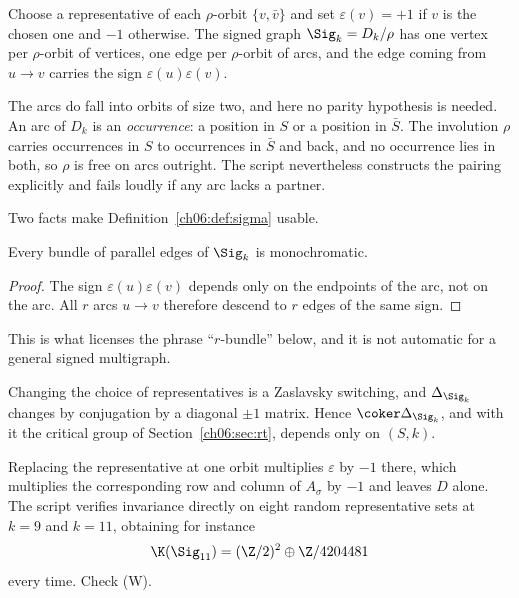 \begin{definition}\label{ch06:def:sigma}
Choose a representative of each $\rho$-orbit $\{v,\bar v\}$ and set $\varepsilon(v)=+1$ if
$v$ is the chosen one and $-1$ otherwise. The signed graph $\Sig_k=D_k/\rho$ has one vertex
per $\rho$-orbit of vertices, one edge per $\rho$-orbit of arcs, and the edge coming from
$u\to v$ carries the sign $\varepsilon(u)\varepsilon(v)$.
\end{definition}

The arcs do fall into orbits of size two, and here no parity hypothesis is needed. An arc of
$D_k$ is an \emph{occurrence}: a position in $S$ or a position in $\bar S$. The involution
$\rho$ carries occurrences in $S$ to occurrences in $\bar S$ and back, and no occurrence lies
in both, so $\rho$ is free on arcs outright. The script nevertheless constructs the pairing
explicitly and fails loudly if any arc lacks a partner.

Two facts make Definition~\ref{ch06:def:sigma} usable.

\begin{lemma}\label{ch06:lem:mono}
Every bundle of parallel edges of $\Sig_k$ is monochromatic.
\end{lemma}

\begin{proof}
The sign $\varepsilon(u)\varepsilon(v)$ depends only on the endpoints of the arc, not on the
arc. All $r$ arcs $u\to v$ therefore descend to $r$ edges of the same sign.
\end{proof}

This is what licenses the phrase ``$r$-bundle'' below, and it is not automatic for a general
signed multigraph.

\begin{lemma}\label{ch06:lem:switch}
Changing the choice of representatives is a Zaslavsky switching, and
$\Delta_{\Sig_k}$ changes by conjugation by a diagonal $\pm1$ matrix. Hence $\coker
\Delta_{\Sig_k}$, and with it the critical group of Section~\ref{ch06:sec:rt}, depends only on
$(S,k)$.
\end{lemma}

Replacing the representative at one orbit multiplies $\varepsilon$ by $-1$ there, which
multiplies the corresponding row and column of $A_\sigma$ by $-1$ and leaves $D$ alone. The
script verifies invariance directly on eight random representative sets at $k=9$ and $k=11$,
obtaining for instance
\[
  \K(\Sig_{11})=(\Z/2)^2\oplus\Z/4204481
\]
every time. Check (W).

